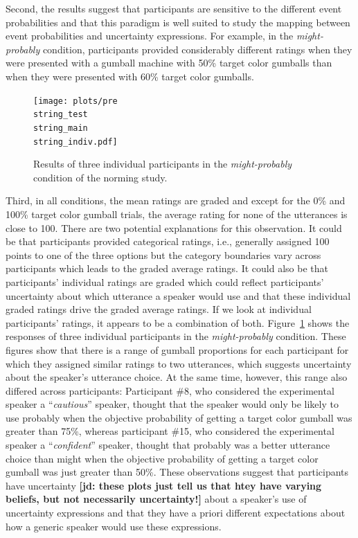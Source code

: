 \documentclass[lucida,biblatex]{sp} %
\newcommand{\jd}[1]{\textcolor{PinkyPurple}{\textbf{[jd: #1]}}}
\begin{document}
Second, the results suggest that participants are sensitive to the different event probabilities and that this paradigm is well suited to study 
the mapping between event probabilities and uncertainty expressions. For example, in the \textit{might-probably} condition, participants
provided considerably different ratings when they were presented with a gumball machine with 50\% target color gumballs than when they
were presented with 60\% target color gumballs.

\begin{figure}
\texttt{[image: plots/pre\\string\_test\\string\_main\\string\_indiv.pdf]}
\caption{Results of three individual participants in the \emph{might-probably} condition of the norming study. \label{fig:norming-results-indiv}}
\end{figure}


Third, in all conditions, the mean ratings are graded and except for the 0\% and 100\% target color gumball trials, the average rating for none of the
utterances is close to 100. There are two potential explanations for this observation. It could be that participants provided categorical ratings, i.e.,
generally assigned 100 points to one of the three options but the category boundaries vary across participants which leads to the graded average ratings.
It could also be that participants' individual ratings are graded which could reflect participants' uncertainty about which utterance a speaker would use 
and that these individual graded ratings drive the  graded average ratings. If we look at individual participants' ratings, it appears to be a combination of both.
Figure~\ref{fig:norming-results-indiv} shows the responses of three individual participants in the \emph{might-probably} condition. These figures show that there 
is a range of gumball proportions for each participant for which they assigned similar ratings to two utterances, which suggests uncertainty about the speaker's 
utterance choice. At the same time, however, this range also differed across participants: Participant \#8, who considered the experimental speaker a ``\textit{cautious}'' speaker, thought that the speaker would only be likely to use {\sc probably} 
when the objective probability of getting a target color gumball was greater than 75\%, whereas participant \#15, who considered the experimental speaker a ``\textit{confident}'' speaker, thought that  {\sc probably} was a better utterance choice than {\sc might} 
when the objective probability of getting a target color gumball was just greater than 50\%. These observations suggest that participants have uncertainty \jd{these plots just tell us that htey have varying beliefs, but not necessarily uncertainty!} about a 
speaker's use of uncertainty expressions and that they have a priori different expectations about how a generic speaker would use these expressions.
\end{document}
